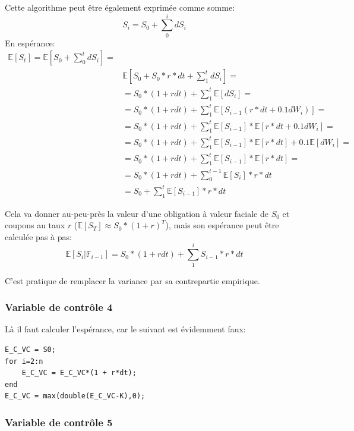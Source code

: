 \documentclass[a4paper,12pt]{scrartcl}
\begin{document}
Cette algorithme peut être également exprimée comme somme:
$$S_i = S_0 + \sum_0^i dS_i$$
En espérance:
\begin{align*}
\mathbb{E}[S_t] = 
\mathbb{E}[S_0 + \sum_0^t dS_i] =  \\
&\mathbb{E}[S_0 + S_0*r*dt +\sum_1^t dS_i] = \\ 
&= S_0*(1+rdt) + \sum_1^t \mathbb{E}[dS_i] = \\
&= S_0*(1+rdt) + \sum_1^t \mathbb{E}[S_{i-1}(r*dt + 0.1dW_{i})] = \\
&= S_0*(1+rdt) + \sum_1^t \mathbb{E}[S_{i-1}]*\mathbb{E}[r*dt + 0.1dW_{i}] = \\
&= S_0*(1+rdt) + \sum_1^t \mathbb{E}[S_{i-1}]*\mathbb{E}[r*dt] + 
                 0.1\mathbb{E}[dW_{i}] = \\
&= S_0*(1+rdt) + \sum_1^t \mathbb{E}[S_{i-1}]*\mathbb{E}[r*dt] = \\
&= S_0*(1+rdt) + \sum_0^{t-1} \mathbb{E}[S_{i}]*r*dt \\
&= S_0 + \sum_1^t \mathbb{E}[S_{i-1}]*r*dt
\end{align*}

Cela va donner au-peu-près la valeur d'une obligation à valeur faciale de $S_0$ et coupons au taux $r$ 
($\mathbb{E}[S_{T}] \approx S_0*(1+r)^T$), 
mais son espérance peut être calculée pas à pas:
$$\mathbb{E}[S_i | \mathbb{F}_{i-1}] = S_0*(1+rdt) + \sum_1^i S_{i-1}*r*dt $$

C'est pratique de remplacer la variance par sa contrepartie empirique. 

\subsubsection{Variable de contrôle 4}


Là il faut calculer l'espérance, car le suivant est évidemment faux:

\begin{lstlisting}
E_C_VC = S0;
for i=2:n
    E_C_VC = E_C_VC*(1 + r*dt);
end
E_C_VC = max(double(E_C_VC-K),0);
\end{lstlisting}

\subsubsection{Variable de contrôle 5}
\end{document}
